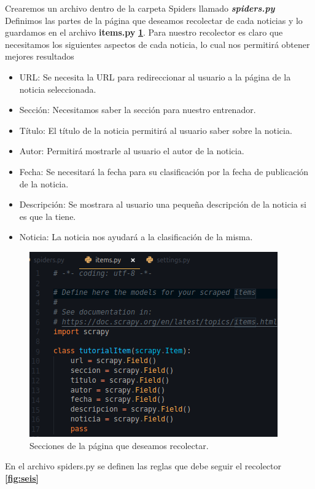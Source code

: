 Crearemos un archivo dentro de la carpeta Spiders llamado \textbf{\textit{spiders.py}} 
\\
Definimos las partes de la página que deseamos recolectar  de cada noticias y lo guardamos en el archivo \textbf{items.py}  \textbf{\ref{fig:cinco}}.
Para nuestro recolector es claro que necesitamos los siguientes aspectos de cada noticia, lo cual nos permitirá obtener mejores resultados
\begin{itemize}
  \item URL: Se necesita la URL para redireccionar al usuario a la página de la noticia seleccionada.
  \item Sección: Necesitamos saber la sección para nuestro entrenador.
  \item Título: El título de la noticia permitirá al usuario saber sobre la noticia.
  \item Autor: Permitirá mostrarle al usuario el autor de la noticia.
  \item Fecha: Se necesitará la fecha para su clasificación por la fecha de publicación de la noticia.
  \item Descripción: Se mostrara al usuario una pequeña descripción de la noticia si es que la tiene.
  \item Noticia: La noticia nos ayudará a la clasificación de la misma.
\end{itemize}

\begin{figure}[H]
  \centering
  \includegraphics[scale=.45]{imagenes/Capitulo5/5}
  \caption{Secciones de la página que deseamos recolectar.}
  \label{fig:cinco}
\end{figure}

En el archivo spiders.py se definen las reglas que debe seguir el recolector \textbf{\ref{fig:seis}}

